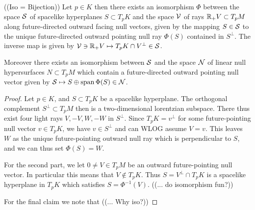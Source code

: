 \begin{lemma}\label{lem:dirreconstr}
    ((Iso = Bijection))
Let $p\in K$ then there exists an isomorphism $\Phi$ between the space $\mathcal{S}$ of spacelike hyperplanes $S\subset T_pK$ and the space $\mathcal{V}$ of rays $\mathbb{R}_+V\subset T_pM$ along future-directed outward facing null vectors, given by the mapping $S\in \mathcal{S}$ to the unique future-directed outward pointing null ray $\Phi(S)$ contained in $S^\perp$. The inverse map is given by $\mathcal{V}\ni \mathbb{R}_+V \mapsto T_pK \cap V^\perp\in \mathcal{S}$.

Moreover there exists an isomorphism between $\mathcal{S}$ and the space $\mathcal{N}$ of linear null hypersurfaces $N\subset T_pM$ which contain a future-directed outward pointing null vector given by $\mathcal{S}\mapsto S\oplus \operatorname{span} \Phi(S)\in \mathcal{N}$.
\end{lemma}
\begin{proof}
    Let $p\in K$, and $S\subset T_pK$ be a spacelike hyperplane. The orthogonal complement $S^\perp\subset T_pM$ then is a two-dimensional lorentzian subspace. There thus exist four light rays $V,-V,W,-W$ in $S^\perp$. Since $T_pK=v^\perp$ for some future-pointing null vector $v\in T_pK$, we have $v\in S^\perp$ and can WLOG assume $V=v$. This leaves $W$ as the unique future-pointing outward null ray which is perpendicular to $S$, and we can thus set $\Phi(S)=W$.

    For the second part, we let $0\neq V\in T_pM$ be an outward future-pointing null vector. In particular this means that $V\notin T_pK$. Thus $S=V^\perp\cap T_pK$ is a spacelike hyperplane in $T_pK$ which satisfies $S=\Phi^{-1}(V)$. ((... do isomorphism fun?))

    For the final claim we note that ((... Why iso?))
\end{proof}


